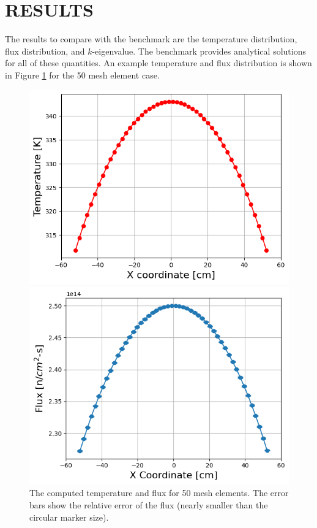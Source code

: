 \documentclass[letterpaper]{mc2023}
\begin{document}
\section{RESULTS}\label{sec:results}
The results to compare with the benchmark are the temperature distribution, flux distribution, and $k$-eigenvalue. The benchmark provides
analytical solutions for all of these quantities. An example temperature and flux distribution is shown in Figure \ref{fig:temp_flux_50}
for the 50 mesh element case.
\begin{figure}
    \centering
    \begin{minipage}[b]{0.485\linewidth}
        \includegraphics[width=\linewidth]{figures/temp_50.png}
    \end{minipage}
    \begin{minipage}[b]{0.485\linewidth}
        \includegraphics[width=\linewidth]{figures/flux_50.png}
    \end{minipage}
    \caption{The computed temperature and flux for 50 mesh elements. The error bars show the relative error of the flux
    (nearly smaller than the circular marker size).}\label{fig:temp_flux_50}
\end{figure}
\end{document}
